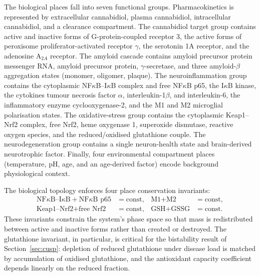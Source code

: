 \documentclass[10pt,letterpaper]{article}
\begin{document}
The biological places fall into seven functional groups. Pharmacokinetics is represented by extracellular cannabidiol, plasma cannabidiol, intracellular cannabidiol, and a clearance compartment. The cannabidiol target group contains active and inactive forms of G-protein-coupled receptor 3, the active forms of peroxisome proliferator-activated receptor $\gamma$, the serotonin 1A receptor, and the adenosine A$_{2A}$ receptor. The amyloid cascade contains amyloid precursor protein messenger RNA, amyloid precursor protein, $\gamma$-secretase, and three amyloid-$\beta$ aggregation states (monomer, oligomer, plaque). The neuroinflammation group contains the cytoplasmic NF$\kappa$B--I$\kappa$B complex and free NF$\kappa$B p65, the I$\kappa$B kinase, the cytokines tumour necrosis factor $\alpha$, interleukin-1$\beta$, and interleukin-6, the inflammatory enzyme cyclooxygenase-2, and the M1 and M2 microglial polarisation states. The oxidative-stress group contains the cytoplasmic Keap1--Nrf2 complex, free Nrf2, heme oxygenase 1, superoxide dismutase, reactive oxygen species, and the reduced/oxidised glutathione couple. The neurodegeneration group contains a single neuron-health state and brain-derived neurotrophic factor. Finally, four environmental compartment places (temperature, pH, age, and an age-derived factor) encode background physiological context.

The biological topology enforces four place conservation invariants:
\begin{align}
\text{NF}\kappa\text{B--I}\kappa\text{B} + \text{NF}\kappa\text{B p65} &= \text{const}, &
\text{M1} + \text{M2} &= \text{const}, \\
\text{Keap1--Nrf2} + \text{free Nrf2} &= \text{const}, &
\text{GSH} + \text{GSSG} &= \text{const}.
\end{align}
These invariants constrain the system's phase space so that mass is redistributed between active and inactive forms rather than created or destroyed. The glutathione invariant, in particular, is critical for the bistability result of Section~\ref{sec:cusp}: depletion of reduced glutathione under disease load is matched by accumulation of oxidised glutathione, and the antioxidant capacity coefficient depends linearly on the reduced fraction.
\end{document}
